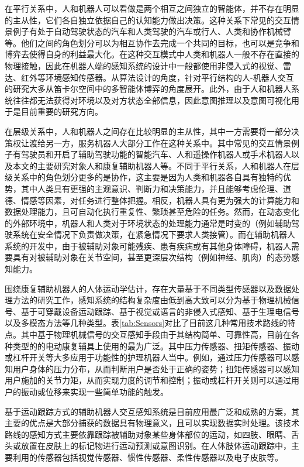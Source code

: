 在平行关系中，人和机器人可以看做是两个相互之间独立的智能体，并不存在明显的主从性，它们各自独立依据自己的认知能力做出决策。这种关系下常见的交互情景例子有处于自动驾驶状态的汽车和人类驾驶的汽车或行人、人类和协作机械臂等。他们之间的角色划分可以为相互协作去完成一个共同的目标，也可以是竞争和博弈去使得自身的利益最大化。在这种交互模式中人类和机器人一般不存在直接的物理接触，因此在机器人端的感知系统的设计中一般都使用非侵入式的视觉、雷达、红外等环境感知传感器。从算法设计的角度，针对平行结构的人-机器人交互的研究大多从笛卡尔空间中的多智能体博弈的角度展开。此外，由于人和机器人系统往往都无法获得对环境以及对方状态全部信息，因此意图推理\cite{fangBehavioralIntentionPrediction2023}以及意图可视化\cite{szafirConnectingHumanRobotInteraction2021}用于是目前重要的研究方向。

在层级关系中，人和机器人之间存在比较明显的主从性，其中一方需要将一部分决策权让渡给另一方，服务机器人大部分工作在这种关系中。其中常见的交互情景例子有驾驶员和开启了辅助驾驶功能的智能汽车、人和遥操作机器人或手术机器人以及本文的主要研究对象人和康复辅助机器人等。不同于平行关系，人和机器人在层级关系中的角色划分更多的是协作，这主要是因为人类和机器各自具有独特的优势，其中人类具有更强的主观意识、判断力和决策能力，并且能够考虑伦理、道德、情感等因素，对任务进行整体把握。相反，机器人具有更为强大的计算能力和数据处理能力，且可自动化执行重复性、繁琐甚至危险的任务。然而，在动态变化的外部环境中，机器人和人类对于环境状态的处理能力通常是时变的（例如辅助驾驶系统在安全情况下负责做决策，在紧急情况下要求人类接管）。而在辅助机器人系统的开发中，由于被辅助对象可能残疾、患有疾病或有其他身体障碍，机器人需要具有对被辅助对象在关节空间，甚至更深层次结构（例如神经、肌肉）的态势感知能力。

围绕康复辅助机器人的人体运动学估计，存在大量基于不同类型传感器以及数据处理方法的研究工作，感知系统的结构复杂度由低到高大致可以分为基于物理机械信号、基于可穿戴设备运动跟踪、基于视觉或语言的非侵入式感知、基于生理电信号以及多模态方法等几种类型。表\ref{tab:Sensors}对比了目前这几种常用技术路线的特点。其中基于物理机械信号的交互感知手段由于其结构简单、可靠性高，目前在各种类型的的电动康复辅具上使用的最为广泛。其中压力传感器、扭矩传感器、振动或杠杆开关等大多应用于功能性的护理机器人当中。例如，通过压力传感器可以感知用户身体的压力分布，从而判断用户是否处于正确的姿势\cite{sharmaPhysicalHumanRobotInteraction2022}；扭矩传感器可以感知用户施加的关节力矩，从而实现力度的调节和控制\cite{chenDevelopmentWearableUpper2022}；振动或杠杆开关则可以通过用户的振动或位移来实现一些简单功能的触发。

基于运动跟踪方式的辅助机器人交互感知系统是目前应用最广泛和成熟的方案，其主要的优点是大部分捕获的数据具有物理意义，且可以实现数据实时处理\cite{scardovelliDesignEvaluationPeripheral2015,lancioniPersonsMultipleDisabilities2013}。该技术路线的感知方式主要依靠跟踪被辅助对象某些身体部位的运动，如四肢、眼睛、舌头或放置在皮肤上的标记物进行运动预测或意图识别。在人体肢体运动跟踪中，主要利用的传感器包括视觉传感器\cite{bianFacialPositionExpressionBased2016}、惯性传感器\cite{tongLSTMBasedLowerLimbs2020,liuNovelMethodParkinson2019,liuDesignWearableWireless2018}、柔性传感器以及电子皮肤\cite{kimDeepFullBodyMotion2019,leePrintableSkinAdhesive2016,jinSoftSensingShirt2020,contreras-gonzalezEfficientUpperLimb2020,samper-escuderoEfficientMultiaxialShoulderMotion2020}等。

